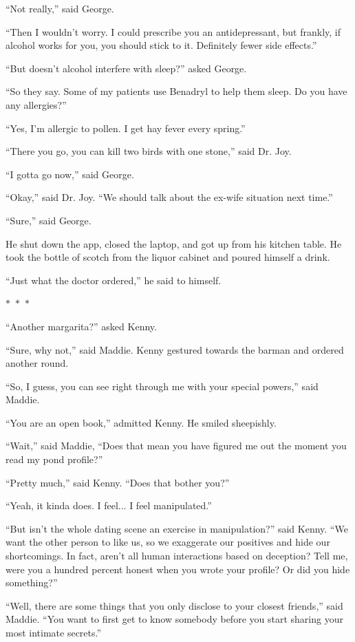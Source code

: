 \documentclass{memoir}
\newcommand{\starbreak}{%
\begin{center}
  $\ast$~$\ast$~$\ast$
\end{center}
}
\begin{document}
``Not really,'' said George.

``Then I wouldn't worry. I could prescribe you an antidepressant, but frankly, if alcohol works for you, you should stick to it. Definitely fewer side effects.''

``But doesn't alcohol interfere with sleep?'' asked George.

``So they say. Some of my patients use Benadryl to help them sleep. Do you have any allergies?''

``Yes, I'm allergic to pollen. I get hay fever every spring.''

``There you go, you can kill two birds with one stone,'' said Dr. Joy.

``I gotta go now,'' said George.

``Okay,'' said Dr. Joy. ``We should talk about the ex-wife situation next time.''

``Sure,'' said George. 

He shut down the app, closed the laptop, and got up from his kitchen table. He took the bottle of scotch from the liquor cabinet and poured himself a drink. 

``Just what the doctor ordered,'' he said to himself.

\starbreak

``Another margarita?'' asked Kenny.

``Sure, why not,'' said Maddie. Kenny gestured towards the barman and ordered another round.

``So, I guess, you can see right through me with your special powers,'' said Maddie.

``You are an open book,'' admitted Kenny. He smiled sheepishly.

``Wait,'' said Maddie, ``Does that mean you have figured me out the moment you read my pond profile?''

``Pretty much,'' said Kenny. ``Does that bother you?''

``Yeah, it kinda does. I feel... I feel manipulated.''

``But isn't the whole dating scene an exercise in manipulation?'' said Kenny. ``We want the other person to like us, so we exaggerate our positives and hide our shortcomings. In fact, aren't all human interactions based on deception? Tell me, were you a hundred percent honest when you wrote your profile? Or did you hide something?''

``Well, there are some things that you only disclose to your closest friends,'' said Maddie. ``You want to first get to know somebody before you start sharing your most intimate secrets.''
\end{document}
